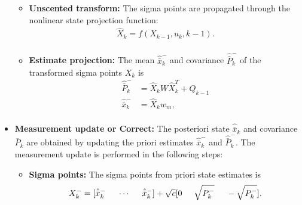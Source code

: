 \begin{itemize}
\begin{itemize}
        \item \textbf{Unscented transform:} The sigma points are propagated through the nonlinear state projection function:
        \begin{equation}
        \begin{split}
            \hat X_k = f(X_{k-1},u_k,k-1). \\
        \end{split}
        \end{equation}
        \item \textbf{Estimate projection:}
        The mean $\hat{\bar x}^-_k$ and covariance $\hat{\bar P}^-_k$ of the transformed sigma points $X_k$ is 
        \begin{equation}
        	\begin{split}
            \hat{\bar P}^-_k &= \hat X_k W \hat X_k^T + Q_{k-1} \\
            \hat{\bar x}^-_k &= \hat X_k w_m, \\
            \end{split}
        \end{equation}
    \end{itemize}
        
    \item \textbf{Measurement update or Correct:} The posteriori state $\hat{\bar x}_k$ and covariance ${\bar P}_k$ are obtained by updating the priori estimates $\hat{\bar x}^-_k$ and $\hat{\bar P}^-_k$. The measurement update is performed in the following steps:
    \begin{itemize}
        \item \textbf{Sigma points:} The sigma points from priori state estimates is
        \begin{equation}
        X_k^- = [ \hat{\bar{x}}_k^- \hspace{5mm} \cdots \hspace{5mm} \hat{\bar{x}}_k^-]+ \sqrt c [ 0 \hspace{5mm} \sqrt{P_k^-} \hspace{5mm} - \sqrt{P_k^-} ].
        \end{equation}


\end{itemize}
\end{itemize}
